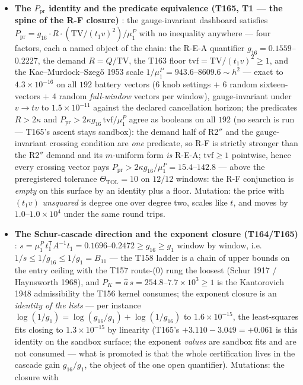 \documentclass[11pt,a4paper]{article}
\begin{document}
\begin{itemize}[leftmargin=1.5em]
\item \textbf{The $P_{\mathrm{pr}}$ identity and the predicate equivalence (T165, T1 ---
the spine of the R-F closure)} \mE: the gauge-invariant dashboard satisfies
$P_{\mathrm{pr}}=g_{16}\cdot R\cdot(\mathrm{TV}/(t_1v)^2)/\mu^P_1$ with no inequality
anywhere --- four factors, each a named object of the chain: the R-E-A quantifier
$g_{16}=0.1559$--$0.2227$, the demand $R=Q/\mathrm{TV}$, the T163 floor
$\mathrm{tvf}=\mathrm{TV}/(t_1v)^2\ge1$, and the Kac--Murdock--Szeg\H{o} 1953 scale
$1/\mu^P_1=943.6$--$8609.6\sim h^2$ --- exact to $4.3\times10^{-16}$ on all $192$
battery vectors ($6$ knob settings $+$ $6$ random sixteen-vectors $+$ $4$ random
\emph{full-window} vectors per window), gauge-invariant under $v\to tv$ to
$1.5\times10^{-11}$ against the declared cancellation horizon; the predicates
$R>2\kappa$ and $P_{\mathrm{pr}}>2\kappa g_{16}\,\mathrm{tvf}/\mu^P_1$ agree as booleans
on all $192$ (no search is run --- T165's ascent stays sandbox): the demand half of
R2$''$ and the gauge-invariant crossing condition are \emph{one} predicate, so R-F is
strictly stronger than the R2$''$ demand and its $m$-uniform form \emph{is} R-E-A;
$\mathrm{tvf}\ge1$ pointwise, hence every crossing vector pays
$P_{\mathrm{pr}}>2\kappa g_{16}/\mu^P_1=15.4$--$142.8$ --- above the preregistered
tolerance $\Theta_{\mathrm{TOL}}=10$ on $12/12$ windows: the R-F conjunction is
\emph{empty} on this surface by an identity plus a floor. Mutation: the price with
$(t_1v)$ \emph{unsquared} is degree one over degree two, scales like $t$, and moves by
$1.0$--$1.0\times10^{4}$ under the same round trips.
\item \textbf{The Schur-cascade direction and the exponent closure (T164/T165)} \mE:
$s=\mu^P_1\,t_1^{\mathsf T}A^{-1}t_1=0.1696$--$0.2472\ge g_{16}\ge g_1$ window by
window, i.e.\ $1/s\le1/g_{16}\le1/g_1=B_{11}$ --- the T158 ladder is a chain of upper
bounds on the entry ceiling with the T157 route-(0) rung the loosest (Schur 1917 /
Haynsworth 1968), and $P_K=\hat a\,s=254.8$--$7.7\times10^{3}\ge1$ is the Kantorovich
1948 admissibility the T156 kernel consumes; the exponent closure is an
\emph{identity of the lists} --- per instance
$\log(1/g_1)=\log(g_{16}/g_1)+\log(1/g_{16})$ to $1.6\times10^{-15}$, the least-squares
fits closing to $1.3\times10^{-15}$ by linearity (T165's $+3.110-3.049=+0.061$ is this
identity on the sandbox surface; the exponent \emph{values} are sandbox fits and are
not consumed --- what is promoted is that the whole certification lives in the cascade
gain $g_{16}/g_1$, the object of the one open quantifier). Mutations: the closure with

\end{itemize}
\end{document}
